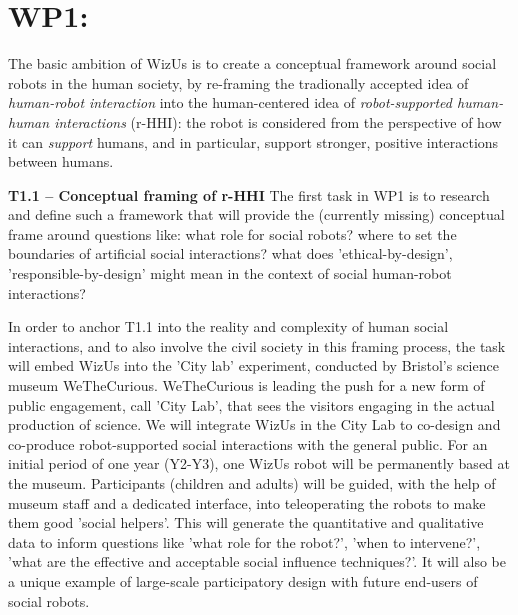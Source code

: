 \documentclass[11pt,a4paper]{report}
\newcommand{\project}{WizUs\xspace}
\begin{document}
\begin{landscape}

\end{landscape}

\newpage



\section{WP1: \textbf{\wpOne}}

\noindent{}

The basic ambition of \project is to create a conceptual framework around social
robots in the human society, by re-framing the tradionally accepted idea of
\emph{human-robot interaction} into the human-centered idea of
\emph{robot-supported human-human interactions} (r-HHI): the robot is considered
from the perspective of how it can \emph{support} humans, and in particular,
support stronger, positive interactions between humans.

\textbf{T1.1 -- Conceptual framing of r-HHI} The first task in WP1 is to research and
define such a framework that will provide the (currently missing) conceptual
frame around questions like: what role for social robots? where to set the
boundaries of artificial social interactions? what does 'ethical-by-design',
'responsible-by-design' might mean in the context of social human-robot
interactions? 

In order to anchor T1.1 into the reality and complexity of human social
interactions, and to also involve the civil society in this framing process, the
task will embed \project into the 'City lab' experiment, conducted by Bristol's
science museum WeTheCurious. WeTheCurious is leading the push for a new form of
public engagement, call 'City Lab', that sees the visitors engaging in the
actual production of science. We will integrate \project in the City Lab to
co-design and co-produce robot-supported social interactions with the general
public. For an initial period of one year (Y2-Y3), one \project robot will be
permanently based at the museum.  Participants (children and adults) will be
guided, with the help of museum staff and a dedicated interface, into
teleoperating the robots to make them good 'social helpers'. This will generate
the quantitative and qualitative data to inform questions like 'what role for
the robot?', 'when to intervene?', 'what are the effective and acceptable social
influence techniques?'. It will also be a unique example of large-scale
participatory design with future end-users of social robots.
\end{document}
